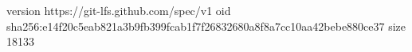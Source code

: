 version https://git-lfs.github.com/spec/v1
oid sha256:e14f20c5eab821a3b9fb399fcab1f7f26832680a8f8a7cc10aa42bebe880ce37
size 18133
